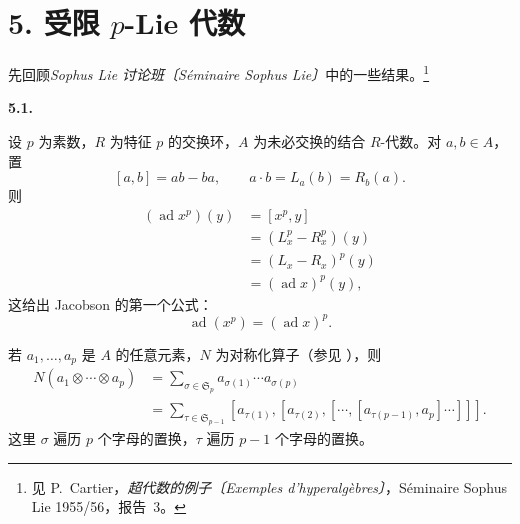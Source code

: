
\section*{5. 受限 \texorpdfstring{\(p\)}{p}-Lie 代数}
\label{sga3:VIIA:5}

先回顾\emph{Sophus Lie 讨论班〔S\'eminaire Sophus Lie〕}中的一些结果。\footnote{见 P.~Cartier，\emph{超代数的例子〔Exemples d'hyperalg\`ebres〕}，S\'eminaire Sophus Lie 1955/56，报告~3。}

\medskip
\noindent\textbf{5.1.}
\label{sga3:VIIA:5.1}

设 \(p\) 为素数，\(R\) 为特征 \(p\) 的交换环，\(A\) 为未必交换的结合 \(R\)-代数。对 \(a,b\in A\)，置
\[
  [a,b]=ab-ba,
  \qquad
  a\cdot b=L_a(b)=R_b(a).
\]
则
\[
\begin{aligned}
  (\operatorname{ad}x^p)(y)
  &=[x^p,y] \\
  &=(L_x^p-R_x^p)(y) \\
  &=(L_x-R_x)^p(y) \\
  &=(\operatorname{ad}x)^p(y),
\end{aligned}
\]
这给出 Jacobson 的第一个公式：
\[
  \tag{i}\label{sga3:vii:paragraph:5-1:equation:i}
  \operatorname{ad}(x^p)
  =
  (\operatorname{ad}x)^p.
\]

若 \(a_1,\ldots,a_p\) 是 \(A\) 的任意元素，\(N\) 为对称化算子（参见 ），则
\begin{equation}
  \tag{*}\label{sga3:vii:paragraph:5-1:equation:star}
\begin{aligned}
  N(a_1\otimes\cdots\otimes a_p)
  &=
  \sum_{\sigma\in\mathfrak S_p}
    a_{\sigma(1)}\cdots a_{\sigma(p)} \\
  &=
  \sum_{\tau\in\mathfrak S_{p-1}}
  [a_{\tau(1)},
    [a_{\tau(2)},
      [\cdots,
        [a_{\tau(p-1)},a_p]
      \cdots]
    ]
  ].
\end{aligned}
\end{equation}
这里 \(\sigma\) 遍历 \(p\) 个字母的置换，\(\tau\) 遍历 \(p-1\) 个字母的置换。

